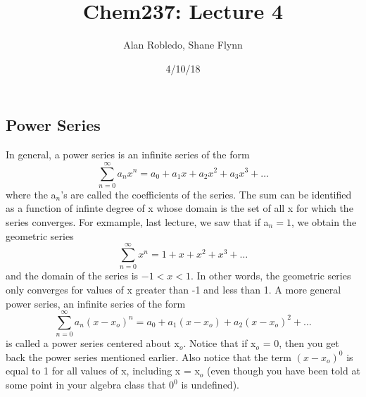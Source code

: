 \documentclass{article}
\title{Chem237: Lecture 4}
\date{4/10/18}
\author{Alan Robledo, Shane Flynn}
\newcommand{\be}{\begin{equation}}
\newcommand{\ee}{\end{equation}}
\newcommand{\sumzero}{\sum_{n=0}^\infty}
\begin{document}
\maketitle

\subsection*{Power Series}
In general, a power series is an infinite series of the form
\be
\sumzero a_n x^n = a_0 + a_1 x + a_2 x^2 + a_3 x^3 + \hdots
\ee
where the a$_n$'s are called the coefficients of the series.
The sum can be identified as a function of infinte degree of x whose domain is the set of all x for which the series converges.
For exmample, last lecture, we saw that if a$_n = 1$, we obtain the geometric series
\be
\sumzero x^n = 1 + x + x^2 + x^3 + \hdots
\ee
and the domain of the series is $-1 < x < 1$.
In other words, the geometric series only converges for values of x greater than -1 and less than 1.
A more general power series, an infinite series of the form
\be
\sumzero a_n (x - x_o)^n = a_0 + a_1 (x - x_o) + a_2 (x - x_o)^2 + \hdots
\ee
is called a power series centered about x$_o$.
Notice that if x$_o$ = 0, then you get back the power series mentioned earlier.
Also notice that the term $(x - x_o)^0$ is equal to 1 for all values of x, including x = x$_o$ (even though you have been told at some point in your algebra class that $0^0$ is undefined).
\end{document}
